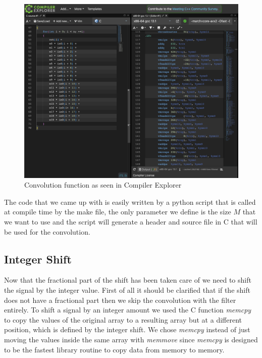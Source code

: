 \documentclass[]{usiinfbachelorproject}
\begin{document}
		\begin{figure}[h]
			\centering
			\includegraphics[width=1\columnwidth]{images/godbolt.png}
			\caption{Convolution function as seen in Compiler Explorer}
			\label{godbolt}
		\end{figure}
				
		
		
		The code that we came up with is easily written by a python script that is called at compile time by the make file, the only parameter we define is the size $M$ that we want to use and the script will generate a header and source file in C that will be used for the convolution.
		
		
		
		\subsection{Integer Shift} 
		Now that the fractional part of the shift has been taken care of we need to shift the signal by the integer value.
		First of all it should be clarified that if the shift does not have a fractional part then we skip the convolution with the filter entirely.
		To shift a signal by an integer amount we used the C function \textsl{memcpy} to copy the values of the original array to a resulting array but at a different position, which is defined by the integer shift. We chose \textsl{memcpy} instead of just moving the values inside the same array with \textsl{memmove} since \textsl{memcpy} is designed to be the fastest library routine to copy data from memory to memory.
		
\end{document}
